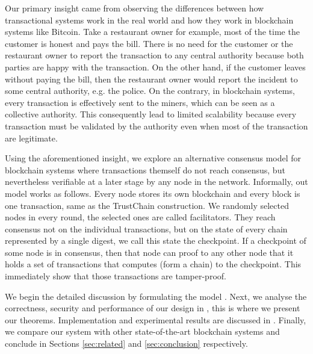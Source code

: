 Our primary insight came from observing the differences between how transactional systems work in the real world and how they work in blockchain systems like Bitcoin. 
Take a restaurant owner for example, most of the time the customer is honest and pays the bill.
There is no need for the customer or the restaurant owner to report the transaction to any central authority 
because both parties are happy with the transaction.
On the other hand, if the customer leaves without paying the bill,
then the restaurant owner would report the incident to some central authority, e.g. the police.
On the contrary, in blockchain systems, every transaction is effectively sent to the miners,
which can be seen as a collective authority.
This consequently lead to limited scalability because every transaction must be validated by the authority even when most of the transaction are legitimate.

Using the aforementioned insight,
we explore an alternative consensus model for blockchain systems where transactions themself do not reach consensus,
but nevertheless verifiable at a later stage by any node in the network.
Informally, out model works as follows.
Every node stores its own blockchain and every block is one transaction, same as the TrustChain construction.
We randomly selected nodes in every round, the selected ones are called facilitators.
They reach consensus not on the individual transactions,
but on the state of every chain represented by a single digest, we call this state the checkpoint.
If a checkpoint of some node is in consensus, 
then that node can proof to any other node that it holds a set of transactions that computes (form a chain) to the checkpoint.
This immediately show that those transactions are tamper-proof.

We begin the detailed discussion by formulating the model . 
Next, we analyse the correctness, security and performance of our design in ,
this is where we present our theorems.
Implementation and experimental results are discussed in .
Finally, we compare our system with other state-of-the-art blockchain systems and conclude in Sections \ref{sec:related} and \ref{sec:conclusion} respectively.

